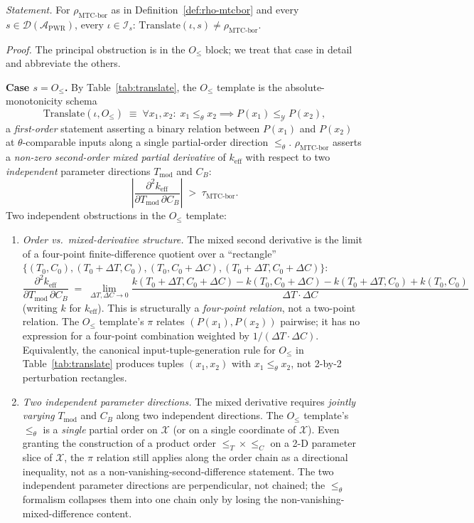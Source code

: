 \documentclass[manuscript]{acmart}
\begin{document}
\emph{Statement.} For $\rho_{\mathrm{MTC\text{-}bor}}$ as in Definition~\ref{def:rho-mtcbor} and every $s \in \mathcal{D}(\mathcal{A}_{\mathrm{PWR}})$, every $\iota \in \mathcal{I}_{s}$: $\mathrm{Translate}(\iota, s) \neq \rho_{\mathrm{MTC\text{-}bor}}$.

\emph{Proof.} The principal obstruction is in the $O_{\le}$ block; we treat that case in detail and abbreviate the others.

\textbf{Case $s = O_{\le}$.} By Table~\ref{tab:translate}, the $O_{\le}$ template is the absolute-monotonicity schema
\[
\mathrm{Translate}(\iota, O_{\le}) \;\equiv\; \forall x_{1}, x_{2}:\; x_{1} \le_{\theta} x_{2} \implies P(x_{1}) \le_{\mathcal{Y}} P(x_{2}),
\]
a \emph{first-order} statement asserting a binary relation between $P(x_{1})$ and $P(x_{2})$ at $\theta$-comparable inputs along a single partial-order direction $\le_{\theta}$. $\rho_{\mathrm{MTC\text{-}bor}}$ asserts a \emph{non-zero second-order mixed partial derivative} of $k_{\mathrm{eff}}$ with respect to two \emph{independent} parameter directions $T_{\mathrm{mod}}$ and $C_{B}$:
\[
\left|\frac{\partial^{2} k_{\mathrm{eff}}}{\partial T_{\mathrm{mod}}\,\partial C_{B}}\right| \;>\; \tau_{\mathrm{MTC\text{-}bor}}.
\]
Two independent obstructions in the $O_{\le}$ template:
\begin{enumerate}[leftmargin=*,nosep]
  \item[(a)] \emph{Order vs.\ mixed-derivative structure.} The mixed second derivative is the limit of a four-point finite-difference quotient over a ``rectangle'' $\{(T_{0}, C_{0}), (T_{0}+\Delta T, C_{0}), (T_{0}, C_{0}+\Delta C), (T_{0}+\Delta T, C_{0}+\Delta C)\}$:
  \[
  \frac{\partial^{2} k_{\mathrm{eff}}}{\partial T_{\mathrm{mod}}\,\partial C_{B}} \;=\; \lim_{\Delta T, \Delta C \to 0} \frac{k(T_{0}+\Delta T, C_{0}+\Delta C) - k(T_{0}, C_{0}+\Delta C) - k(T_{0}+\Delta T, C_{0}) + k(T_{0}, C_{0})}{\Delta T \cdot \Delta C}
  \]
  (writing $k$ for $k_{\mathrm{eff}}$). This is structurally a \emph{four-point relation}, not a two-point relation. The $O_{\le}$ template's $\pi$ relates $(P(x_{1}), P(x_{2}))$ pairwise; it has no expression for a four-point combination weighted by $1/(\Delta T \cdot \Delta C)$. Equivalently, the canonical input-tuple-generation rule for $O_{\le}$ in Table~\ref{tab:translate} produces tuples $(x_{1}, x_{2})$ with $x_{1} \le_{\theta} x_{2}$, not 2-by-2 perturbation rectangles.
  \item[(b)] \emph{Two independent parameter directions.} The mixed derivative requires \emph{jointly varying} $T_{\mathrm{mod}}$ and $C_{B}$ along two independent directions. The $O_{\le}$ template's $\le_{\theta}$ is a \emph{single} partial order on $\mathcal{X}$ (or on a single coordinate of $\mathcal{X}$). Even granting the construction of a product order $\le_{T} \times \le_{C}$ on a 2-D parameter slice of $\mathcal{X}$, the $\pi$ relation still applies along the order chain as a directional inequality, not as a non-vanishing-second-difference statement. The two independent parameter directions are perpendicular, not chained; the $\le_{\theta}$ formalism collapses them into one chain only by losing the non-vanishing-mixed-difference content.
\end{enumerate}
\end{document}
